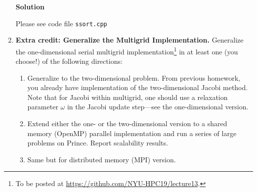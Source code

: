 \documentclass[12pt]{article}
\begin{document}
\begin{enumerate}
  \textbf{Solution}
  
  Please see code file \texttt{ssort.cpp}

  

\item {\bf Extra credit: Generalize the Multigrid Implementation.} Generalize the
  one-dimensional serial multigrid
  implementation\footnote{To be posted at \url{https://github.com/NYU-HPC19/lecture13}.}
  in at least one (you choose!) of the following directions:
  \begin{enumerate}
    \item Generalize to the two-dimensional problem. From previous
      homework, you already have implementation of the two-dimensional
      Jacobi method. Note that for Jacobi within multigrid, one should
      use a relaxation parameter $\omega$ in the Jacobi update
      step---see the one-dimensional version.
    \item Extend either the one- or the two-dimensional version to a
      shared memory (OpenMP) parallel implementation and run a series
      of large problems on Prince. Report scalability results.
    \item Same but for distributed memory (MPI) version.
  \end{enumerate}


\end{enumerate}
\end{document}
